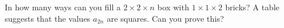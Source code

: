 In how many ways can you fill a $2 \times 2 \times n$ box with $1 \times 1 \times 2$ bricks? A table suggests that the values $a_{2n}$ are squares. Can you prove this?
